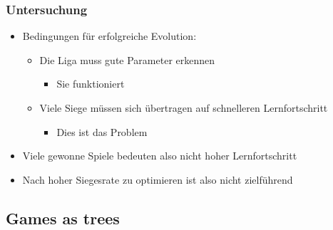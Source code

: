 \begin{frame}
 \frametitle{Untersuchung}
  


\begin{itemize}
  \item \pause Bedingungen für erfolgreiche Evolution:
\begin{itemize}
  \item \pause Die Liga muss gute Parameter erkennen
\begin{itemize}
  \item \pause Sie funktioniert
\end{itemize}
  \item \pause Viele Siege müssen sich übertragen auf schnelleren Lernfortschritt
\begin{itemize}
  \item \pause Dies ist das Problem
\end{itemize}
\end{itemize}
  \item \pause Viele gewonne Spiele bedeuten also nicht hoher Lernfortschritt
  \item \pause Nach hoher Siegesrate zu optimieren ist also nicht zielführend
\end{itemize}

  
\end{frame}

\subsection{Games as trees}



